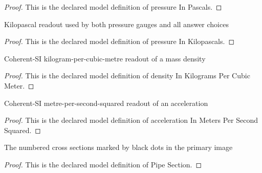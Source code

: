 \begin{proof}
  This is the declared model definition of pressure In Pascals.
\end{proof}
\begin{definition}
  \label{def:physics:phyx-mini-0724:phyxminiproblems-problemphyxmini0724-pressureinkilopascals}
  Kilopascal readout used by both pressure gauges and all answer choices
\end{definition}
\begin{proof}
  This is the declared model definition of pressure In Kilopascals.
\end{proof}
\begin{definition}
  \label{def:physics:phyx-mini-0724:phyxminiproblems-problemphyxmini0724-densityinkilogramspercubicmeter}
  Coherent-SI kilogram-per-cubic-metre readout of a mass density
\end{definition}
\begin{proof}
  This is the declared model definition of density In Kilograms Per Cubic Meter.
\end{proof}
\begin{definition}
  \label{def:physics:phyx-mini-0724:phyxminiproblems-problemphyxmini0724-accelerationinmeterspersecondsquared}
  Coherent-SI metre-per-second-squared readout of an acceleration
\end{definition}
\begin{proof}
  This is the declared model definition of acceleration In Meters Per Second Squared.
\end{proof}
\begin{definition}
  \label{def:physics:phyx-mini-0724:phyxminiproblems-problemphyxmini0724-pipesection}
  The numbered cross sections marked by black dots in the primary image
\end{definition}
\begin{proof}
  This is the declared model definition of Pipe Section.
\end{proof}
